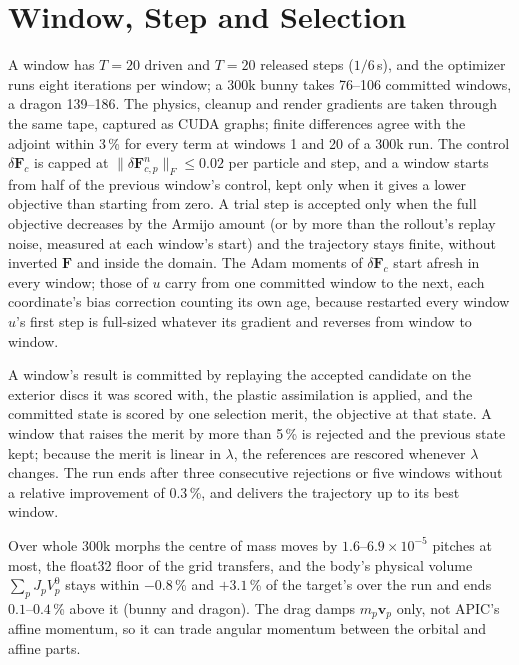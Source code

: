 \section{Window, Step and Selection}
\label{app:ch4_method}
A window has $T=20$ driven and $T=20$ released steps ($1/6$\,s), and the optimizer runs eight iterations per window; a 300k
bunny takes 76--106 committed windows, a dragon 139--186. The physics, cleanup and render gradients are taken through the
same tape, captured as CUDA graphs; finite differences agree with the adjoint within 3\,\% for every term at windows 1 and 20
of a 300k run. The control $\delta\mathbf{F}_c$ is capped at $\lVert\delta\mathbf{F}^{n}_{c,p}\rVert_F\le0.02$ per particle and
step, and a window starts from half of the previous window's control, kept only when it gives a lower objective than
starting from zero. A trial step is accepted only when the full objective decreases by the Armijo amount (or by more than
the rollout's replay noise, measured at each window's start) and the trajectory stays finite, without inverted $\mathbf{F}$
and inside the domain. The Adam moments of $\delta\mathbf{F}_c$ start afresh in every window; those of $u$ carry from one
committed window to the next, each coordinate's bias correction counting its own age, because restarted every window $u$'s
first step is full-sized whatever its gradient and reverses from window to window.

A window's result is committed by replaying the accepted candidate on the exterior discs it was scored with, the plastic
assimilation is applied, and the committed state is scored by one selection merit, the objective at that state. A window
that raises the merit by more than 5\,\% is rejected and the previous state kept; because the merit is linear in $\lambda$,
the references are rescored whenever $\lambda$ changes. The run ends after three consecutive rejections or five windows
without a relative improvement of 0.3\,\%, and delivers the trajectory up to its best window.

Over whole 300k morphs the centre of mass moves by $1.6$--$6.9\times10^{-5}$ pitches at most, the float32 floor of the grid
transfers, and the body's physical volume $\sum_p J_pV^0_p$ stays within $-0.8$\,\% and $+3.1$\,\% of the target's over the
run and ends $0.1$--$0.4$\,\% above it (bunny and dragon). The drag damps $m_p\mathbf{v}_p$ only, not APIC's affine
momentum, so it can trade angular momentum between the orbital and affine parts.

